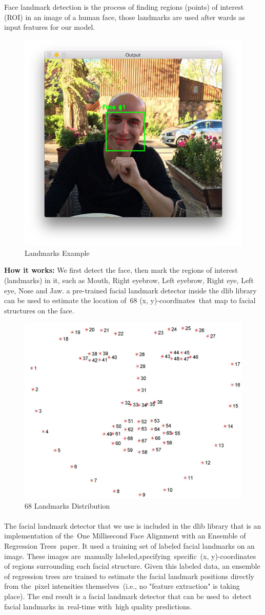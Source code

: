 Face landmark detection is the process of finding regions (points) of interest (ROI) in an image of a human face, those landmarks are used after wards as input features for our model.
\begin{figure}[H]
	\centering
	\includegraphics[width=.4\linewidth]{images/lm1.jpg}
	\caption{Landmarks Example}
\end{figure}
\textbf{How it works:}\newline
We first detect the face, then mark the regions of interest (landmarks) in it, such as Mouth, Right eyebrow, Left eyebrow, Right eye, Left eye, Nose and Jaw.\newline
a pre-trained facial landmark detector inside the dlib library can be used to estimate the location of 68 (x, y)-coordinates that map to facial structures on the face.

\begin{figure}[H]
	\centering
	\includegraphics[width=.3\linewidth]{images/lm2.jpg}
	\caption{68 Landmarks Distribution}
\end{figure}

\paragraph{}
The facial landmark detector that we use is included in the dlib library that is an implementation of the One Millisecond Face Alignment with an Ensemble of Regression Trees paper\cite{lm}.\newline
It used a training set of labeled facial landmarks on an image. These images are manually labeled,specifying specific (x, y)-coordinates of regions surrounding each facial structure.\newline
Given this labeled data, an ensemble of regression trees are trained to estimate the facial landmark positions directly from the pixel intensities themselves (i.e., no "feature extraction" is taking place).\newline
The end result is a facial landmark detector that can be used to detect facial landmarks in real-time with high quality predictions.


